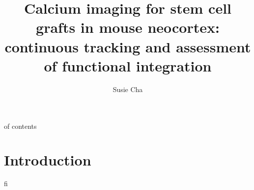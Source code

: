 \title{Calcium imaging for stem cell grafts in mouse neocortex: continuous tracking and assessment of functional integration}
\author{Susie Cha}



\maketitle

\table of contents

\section{Introduction}

fi

